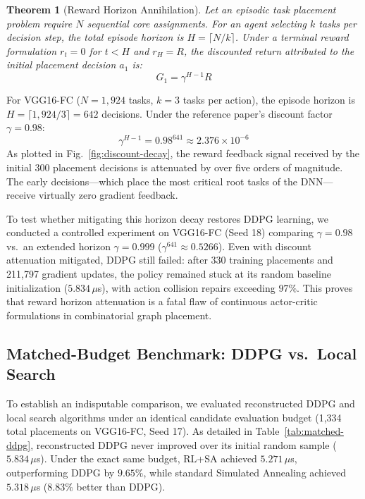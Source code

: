 \documentclass[10pt,conference]{IEEEtran}
\newtheorem{theorem}{Theorem}
\begin{document}
\begin{theorem}[Reward Horizon Annihilation]
Let an episodic task placement problem require $N$ sequential core assignments. For an agent selecting $k$ tasks per decision step, the total episode horizon is $H = \lceil N / k \rceil$. Under a terminal reward formulation $r_t = 0$ for $t < H$ and $r_H = R$, the discounted return attributed to the initial placement decision $a_1$ is:
\begin{equation}
  G_1 = \gamma^{H-1} R
\end{equation}
\end{theorem}
For VGG16-FC ($N = 1,924$ tasks, $k = 3$ tasks per action), the episode horizon is $H = \lceil 1,924 / 3 \rceil = 642$ decisions. Under the reference paper's discount factor $\gamma = 0.98$:
\begin{equation}
  \gamma^{H-1} = 0.98^{641} \approx 2.376 \times 10^{-6}
\end{equation}
As plotted in Fig.~\ref{fig:discount-decay}, the reward feedback signal received by the initial 300 placement decisions is attenuated by over five orders of magnitude. The early decisions—which place the most critical root tasks of the DNN—receive virtually zero gradient feedback. 

To test whether mitigating this horizon decay restores DDPG learning, we conducted a controlled experiment on VGG16-FC (Seed 18) comparing $\gamma = 0.98$ vs.\ an extended horizon $\gamma = 0.999$ ($\gamma^{641} \approx 0.5266$). Even with discount attenuation mitigated, DDPG still failed: after 330 training placements and 211,797 gradient updates, the policy remained stuck at its random baseline initialization ($5.834\,\mu$s), with action collision repairs exceeding $97\%$. This proves that reward horizon attenuation is a fatal flaw of continuous actor-critic formulations in combinatorial graph placement.

\subsection{Matched-Budget Benchmark: DDPG vs.\ Local Search}
To establish an indisputable comparison, we evaluated reconstructed DDPG and local search algorithms under an identical candidate evaluation budget (1,334 total placements on VGG16-FC, Seed 17). As detailed in Table~\ref{tab:matched-ddpg}, reconstructed DDPG never improved over its initial random sample ($5.834\,\mu$s). Under the exact same budget, RL+SA achieved $5.271\,\mu$s, outperforming DDPG by $\mathbf{9.65\%}$, while standard Simulated Annealing achieved $5.318\,\mu$s ($\mathbf{8.83\%}$ better than DDPG).
\end{document}
